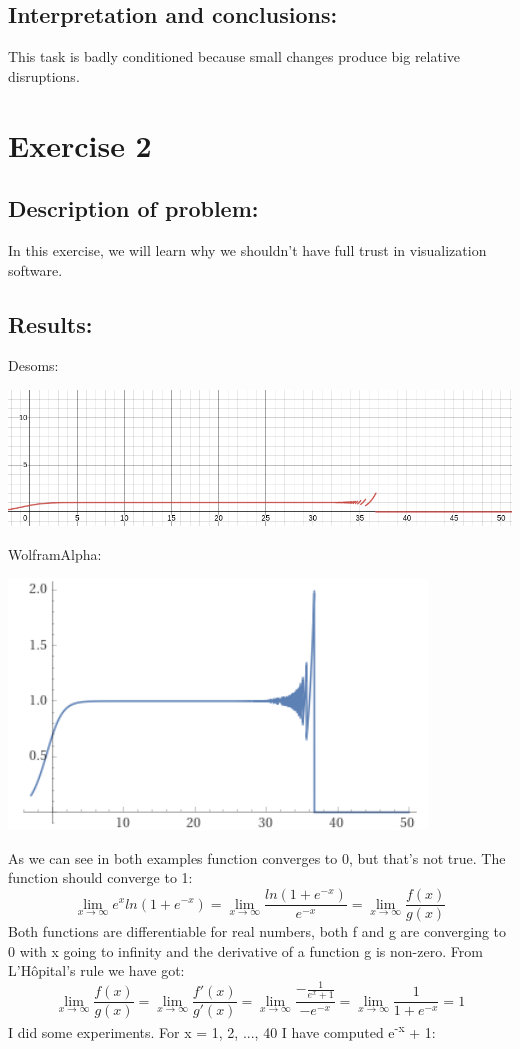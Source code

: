 \documentclass{article}
\begin{document}
    \subsection*{Interpretation and conclusions:}
    This task is badly conditioned because small changes produce big relative disruptions.
\newpage
    \section*{Exercise 2}

\subsection*{Description of problem:}
In this exercise, we will learn why we shouldn't have full trust in visualization software.
\subsection*{Results:}
Desoms:
\begin{center}
    \includegraphics[scale=0.35]{desmos}
\end{center}
WolframAlpha:
\begin{center}
    \includegraphics[scale=0.5]{wolfram}
\end{center}
As we can see in both examples function converges to 0, but that's not true. The function should converge to 1:
\[
    \lim_{x\to\infty} e^x ln(1 + e^{-x}) = \lim_{x\to\infty} \frac{ln(1 + e^{-x})}{e^{-x}} = \lim_{x\to\infty} \frac{f(x)}{g(x)}
\]
Both functions are differentiable for real numbers, both f and g are converging to 0 with x going to infinity and the derivative of a function g is non-zero. From L'Hôpital's rule we have got:
\[
    \lim_{x\to\infty} \frac{f(x)}{g(x)} = \lim_{x\to\infty} \frac{f'(x)}{g'(x)} = \lim_{x\to\infty} \frac{-\frac{1}{e^x + 1}}{-e^{-x}} = \lim_{x\to\infty} \frac{1}{1 + e^{-x}} = 1
\]
\newpage
I did some experiments. For x = 1, 2, ..., 40 I have computed e\textsuperscript{-x} + 1:
\end{document}
